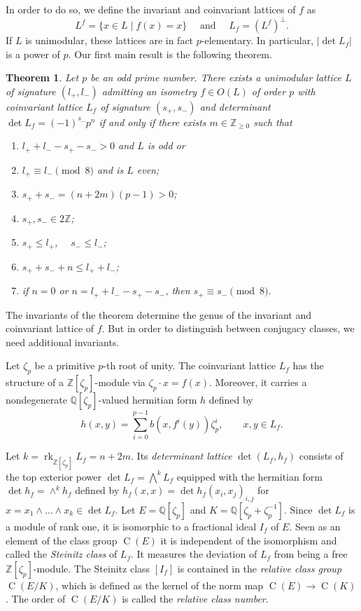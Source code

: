 \documentclass{amsart}
\theoremstyle{definition}
\theoremstyle{plain}
\newtheorem{theorem}[definition]{Theorem}
\DeclareMathOperator{\Cl}{C}
\DeclareMathOperator{\rk}{rk}
\newcommand{\QQ}{\mathbb{Q}}
\newcommand{\ZZ}{\mathbb{Z}}
\begin{document}
In order to do so, we define the invariant and coinvariant lattices of $f$ as
\[L^f=\{x \in L \mid f(x)=x\} \quad \mbox{ and }\quad L_f=\left(L^f\right)^\perp.\]
If $L$ is unimodular, these lattices are in fact $p$-elementary. In particular, $|\det L_f|$ is a power of $p$.
Our first main result is the following theorem.
\begin{theorem} \label{thm: classific unimod}
Let $p$ be an odd prime number. There exists a unimodular lattice
$L$ of signature $(l_+,l_-)$ admitting an isometry $f \in O(L)$
of order $p$ with coinvariant lattice $L_f$ of signature $(s_+,s_-)$
and determinant $\det L_f = (-1)^{s_-}p^n$
if and only if there exists
$m\in \ZZ_{\geq 0}$ such that
\begin{enumerate}
\setlength{\itemsep}{5pt}
\item[(I)] $l_+ + l_- - s_+ - s_- > 0$ and $L$ is odd or
\item[(II)] $l_+ \equiv l_- \pmod{8}$ and is $L$ even;
\item $s_+ + s_- = (n+2m)(p-1)>0$;
\item $s_+, s_- \in 2\ZZ$;
\item $s_+ \leq l_+$, $ \quad s_- \leq l_-$;
\item $s_+ + s_- + n \leq l_+ + l_-$;\item if $n = 0$ or $n=l_+ +l_- - s_+ - s_-$,
then $s_+ \equiv s_- \pmod{8}$.
\end{enumerate}
\end{theorem}
The invariants of the theorem determine the genus of the invariant and coinvariant lattice of $f$. But in order to distinguish between conjugacy classes, we need additional invariants.

Let $\zeta_p$ be a primitive $p$-th root of unity.
The coinvariant lattice $L_f$ has the structure of a
$\ZZ[\zeta_p]$-module via $\zeta_p \cdot x = f(x)$.
Moreover, it carries a nondegenerate $\QQ[\zeta_p]$-valued hermitian form $h$ defined by
\[h(x,y) = \sum_{i=0}^{p-1} b(x,f^i(y))\zeta_p^i, \qquad x,y \in L_f.\]

Let $k = \rk_{\ZZ[\zeta_p]} L_f=n+2m$. Its \emph{determinant lattice} $\det(L_f,h_f)$ consists of the top exterior power $\det L_f = \bigwedge^k L_f$ equipped with the hermitian form $\det h_f=\wedge^k h_f$ defined by
$h_f(x,x)=\det h_f(x_i,x_j)_{i,j}$ for $x=x_1 \wedge \ldots \wedge x_k \in \det L_f$.
Let $E=\QQ[\zeta_p]$ and $K= \QQ[\zeta_p + \zeta_p^{-1}]$. Since $\det L_f$ is a module of rank one, it is isomorphic to a fractional ideal $I_f$ of $E$. Seen as an element of the class group $\Cl(E)$ it is independent of the isomorphism and called the \emph{Steinitz class} of $L_f$. It measures the deviation of $L_f$ from being a free $\ZZ[\zeta_p]$-module. The Steinitz class $[I_f]$ is contained in the \emph{relative class group} $\Cl(E/K)$, which is defined as the kernel of the norm map $\Cl(E) \rightarrow \Cl(K)$. The order of $\Cl(E/K)$ is called the \emph{relative class number}.
\end{document}
